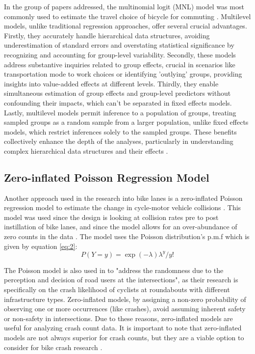 \documentclass[12pt, letterpaper]{article}
\begin{document}
In the group of papers addressed, the multinomial logit (MNL) model was most commonly used to estimate the travel choice of bicycle for commuting \cite{10Zhao2013}. Multilevel models, unlike traditional regression approaches, offer several crucial advantages. Firstly, they accurately handle hierarchical data structures, avoiding underestimation of standard errors and overstating statistical significance by recognizing and accounting for group-level variability. Secondly, these models address substantive inquiries related to group effects, crucial in scenarios like transportation mode to work choices or identifying 'outlying' groups, providing insights into value-added effects at different levels. Thirdly, they enable simultaneous estimation of group effects and group-level predictors without confounding their impacts, which can't be separated in fixed effects models. Lastly, multilevel models permit inference to a population of groups, treating sampled groups as a random sample from a larger population, unlike fixed effects models, which restrict inferences solely to the sampled groups. These benefits collectively enhance the depth of the analyses, particularly in understanding complex hierarchical data structures and their effects \cite{Rasbash_2023}.

\subsection{Zero-inflated Poisson Regression Model}
\label{sec:pois}

Another approach  used in the research into bike lanes is a zero-inflated Poisson regression model to estimate the change in cycle-motor vehicle collisions \cite{8Bhatia2016}. This model was used since the design is looking at collision rates pre to post instillation of bike lanes, and since the model allows for an over-abundance of zero counts in the data \cite{Giles2010}. The model uses the Poisson distribution's p.m.f which is given by equation \ref{eq:2}:
\begin{equation} \label{eq:2}
P(Y=y) = \exp{(-\lambda)\lambda^{y}}/y!
\end{equation}

The Poisson model is also used in \citet{9Cantisani2021} to "address the randomness due to the perception and decision of road users at the intersections", as their research is specifically on the crash likelihood of cyclists at roundabouts with different infrastructure types. Zero-inflated models, by assigning a non-zero probability of observing one or more occurrences (like crashes), avoid assuming inherent safety or non-safety in intersections. Due to these reasons, zero-inflated models are useful for analyzing crash count data. It is important to note that zero-inflated models are not always superior for crash counts, but they are a viable option to consider for bike crash research \cite{Pew_Warr_Schultz_Heaton_2020}. 
\end{document}
